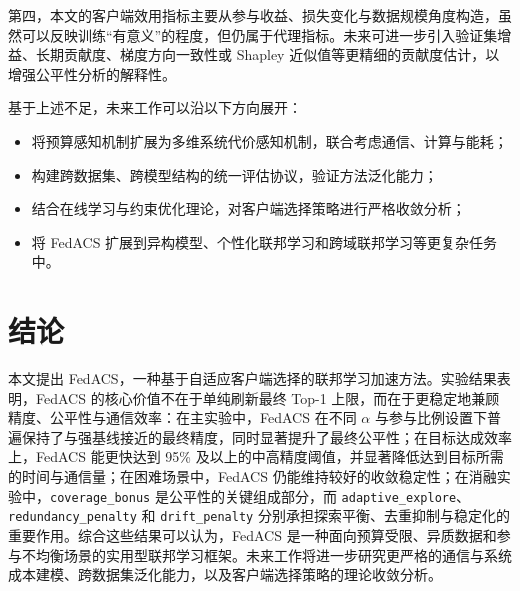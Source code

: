 \documentclass[UTF8,11pt]{ctexart}
\begin{document}
第四，本文的客户端效用指标主要从参与收益、损失变化与数据规模角度构造，虽然可以反映训练“有意义”的程度，但仍属于代理指标。未来可进一步引入验证集增益、长期贡献度、梯度方向一致性或 Shapley 近似值等更精细的贡献度估计，以增强公平性分析的解释性\cite{li2024adafl,wang2025resource,liu2024fairness,marfo2025efficient}。

基于上述不足，未来工作可以沿以下方向展开：
\begin{itemize}
  \item 将预算感知机制扩展为多维系统代价感知机制，联合考虑通信、计算与能耗；
  \item 构建跨数据集、跨模型结构的统一评估协议，验证方法泛化能力；
  \item 结合在线学习与约束优化理论，对客户端选择策略进行严格收敛分析；
  \item 将 FedACS 扩展到异构模型、个性化联邦学习和跨域联邦学习等更复杂任务中。
\end{itemize}

\section{结论}
本文提出 FedACS，一种基于自适应客户端选择的联邦学习加速方法。实验结果表明，FedACS 的核心价值不在于单纯刷新最终 Top-1 上限，而在于更稳定地兼顾精度、公平性与通信效率：在主实验中，FedACS 在不同 $\alpha$ 与参与比例设置下普遍保持了与强基线接近的最终精度，同时显著提升了最终公平性；在目标达成效率上，FedACS 能更快达到 95\% 及以上的中高精度阈值，并显著降低达到目标所需的时间与通信量；在困难场景中，FedACS 仍能维持较好的收敛稳定性；在消融实验中，\texttt{coverage\_bonus} 是公平性的关键组成部分，而 \texttt{adaptive\_explore}、\texttt{redundancy\_penalty} 和 \texttt{drift\_penalty} 分别承担探索平衡、去重抑制与稳定化的重要作用。综合这些结果可以认为，FedACS 是一种面向预算受限、异质数据和参与不均衡场景的实用型联邦学习框架。未来工作将进一步研究更严格的通信与系统成本建模、跨数据集泛化能力，以及客户端选择策略的理论收敛分析。


\end{document}
